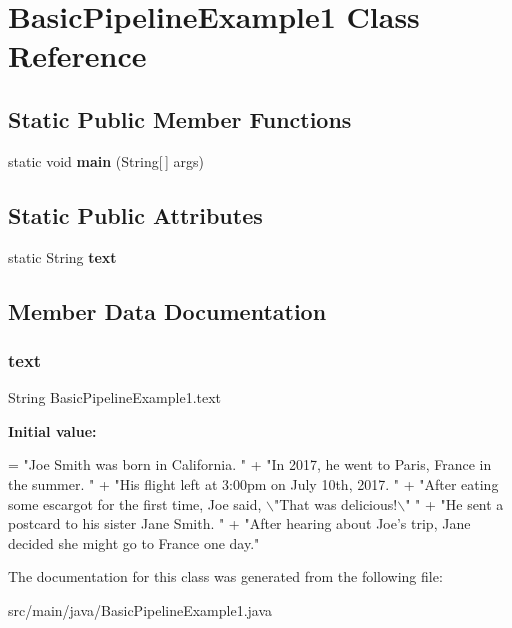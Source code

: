 \hypertarget{classBasicPipelineExample1}{}\section{Basic\+Pipeline\+Example1 Class Reference}
\label{classBasicPipelineExample1}
\subsection*{Static Public Member Functions}
\begin{DoxyCompactItemize}
\item 
\mbox{\label{classBasicPipelineExample1_a2107ad2f78c9013beb305ff9e15bf159}} 
static void {\bfseries main} (String\mbox{[}$\,$\mbox{]} args)
\end{DoxyCompactItemize}
\subsection*{Static Public Attributes}
\begin{DoxyCompactItemize}
\item 
static String {\bfseries text}
\end{DoxyCompactItemize}


\subsection{Member Data Documentation}
\mbox{\label{classBasicPipelineExample1_a0ca79fd3354a9220b49f824a02d6a26a}} 
\subsubsection{\texorpdfstring{text}{text}}
{\footnotesize\ttfamily String Basic\+Pipeline\+Example1.\+text\hspace{0.3cm}{\ttfamily [static]}}

{\bfseries Initial value\+:}
\begin{DoxyCode}
= \textcolor{stringliteral}{"Joe Smith was born in California. "} +
            \textcolor{stringliteral}{"In 2017, he went to Paris, France in the summer. "} +
            \textcolor{stringliteral}{"His flight left at 3:00pm on July 10th, 2017. "} +
            \textcolor{stringliteral}{"After eating some escargot for the first time, Joe said, \(\backslash\)"That was delicious!\(\backslash\)" "} +
            \textcolor{stringliteral}{"He sent a postcard to his sister Jane Smith. "} +
            \textcolor{stringliteral}{"After hearing about Joe's trip, Jane decided she might go to France one day."}
\end{DoxyCode}


The documentation for this class was generated from the following file\+:\begin{DoxyCompactItemize}
\item 
src/main/java/Basic\+Pipeline\+Example1.\+java\end{DoxyCompactItemize}

